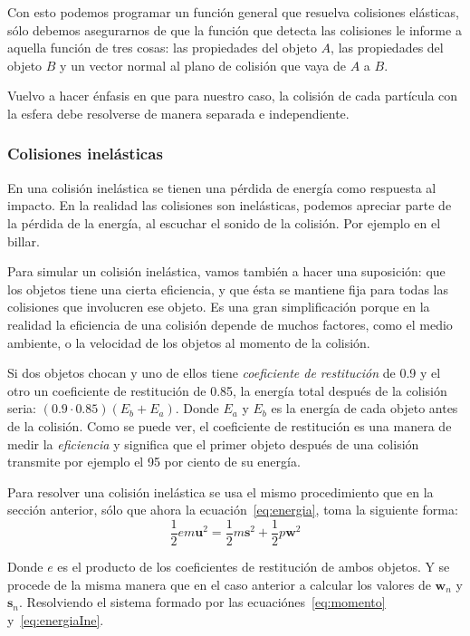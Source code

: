 Con esto podemos programar un función general que resuelva colisiones elásticas, sólo debemos asegurarnos de que la función que detecta las colisiones le informe a aquella función de tres cosas: las propiedades del objeto $A$, las propiedades del objeto $B$ y un vector normal al plano de colisión que vaya de $A$ a $B$.

Vuelvo a hacer énfasis en que para nuestro caso, la colisión de cada partícula con la esfera debe resolverse de manera separada e independiente.

\subsubsection{Colisiones inelásticas}
En una colisión inelástica se tienen una pérdida de energía como respuesta al impacto.
En la realidad las colisiones son inelásticas, podemos apreciar parte de la pérdida de la energía, al escuchar el sonido de la colisión.
Por ejemplo en el billar.

Para simular un colisión inelástica, vamos también a hacer una suposición: que los objetos tiene una cierta eficiencia, y que ésta se mantiene fija para todas las colisiones que involucren ese objeto.
Es una gran simplificación porque en la realidad la eficiencia de una colisión depende de muchos factores, como el medio ambiente, o la velocidad de los objetos al momento de la colisión.

Si dos objetos chocan y uno de ellos tiene \emph{coeficiente de restitución} de 0.9 y el otro un coeficiente de restitución de 0.85, la energía total después de la colisión seria: $\left( \text{0.9} \cdot \text{0.85} \right) \left(  E_b + E_a \right)$.
Donde $E_a$ y $E_b$ es la energía de cada objeto antes de la colisión.
Como se puede ver, el coeficiente de restitución es una manera de medir la \emph{eficiencia} y significa que el primer objeto después de una colisión transmite por ejemplo el 95 por ciento de su energía.

Para resolver una colisión inelástica se usa el mismo procedimiento que en la sección anterior, sólo que ahora la ecuación~\eqref{eq:energia}, toma la siguiente forma:
\begin{equation}
 \frac{1}{2} e m \textbf{u}^2 = \frac{1}{2} m \textbf{s}^2 + \frac{1}{2} p \textbf{w}^2
 \label{eq:energiaIne} 
\end{equation} 

Donde $e$ es el producto de los coeficientes de restitución de ambos objetos. Y se procede de la misma manera que en el caso anterior a calcular los valores de $\textbf{w}_n$ y $\textbf{s}_n$. Resolviendo el sistema formado por las ecuaciónes~\eqref{eq:momento} y~\eqref{eq:energiaIne}.

